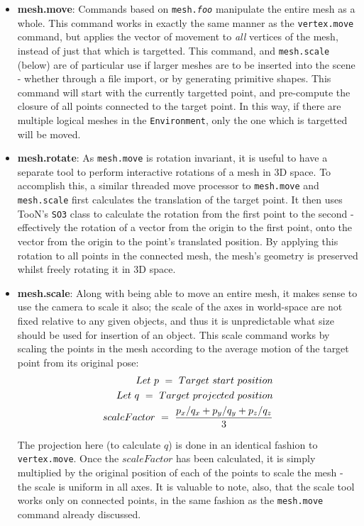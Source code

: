 \documentclass[a4paper,10pt]{report}
\begin{document}
\begin{itemize}
\item{\textbf{mesh.move}: Commands based on \texttt{mesh.\textit{foo}} manipulate the entire mesh as a whole. This command works in exactly the same manner as the \texttt{vertex.move} command, but applies the vector of movement to \textit{all} vertices of the mesh, instead of just that which is targetted. This command, and \texttt{mesh.scale} (below) are of particular use if larger meshes are to be inserted into the scene - whether through a file import, or by generating primitive shapes. This command will start with the currently targetted point, and pre-compute the closure of all points connected to the target point. In this way, if there are multiple logical meshes in the \texttt{Environment}, only the one which is targetted will be moved.}

\item{\textbf{mesh.rotate}: As \texttt{mesh.move} is rotation invariant, it is useful to have a separate tool to perform interactive rotations of a mesh in 3D space. To accomplish this, a similar threaded move processor to \texttt{mesh.move} and \texttt{mesh.scale} first calculates the translation of the target point. It then uses TooN's \texttt{SO3} class to calculate the rotation from the first point to the second - effectively the rotation of a vector from the origin to the first point, onto the vector from the origin to the point's translated position. By applying this rotation to all points in the connected mesh, the mesh's geometry is preserved whilst freely rotating it in 3D space.}

\item{\textbf{mesh.scale}: Along with being able to move an entire mesh, it makes sense to use the camera to scale it also; the scale of the axes in world-space are not fixed relative to any given objects, and thus it is unpredictable what size should be used for insertion of an object. This scale command works by scaling the points in the mesh according to the average motion of the target point from its original pose:
\begin{eqnarray*}
  Let~ p ~=~ Target~start~position \\
  Let~ q ~=~ Target~projected~position \\
  scaleFactor ~=~ {p_x / q_x + p_y / q_y + p_z / q_z \over 3}  
\end{eqnarray*}

The projection here (to calculate $q$) is done in an identical fashion to \texttt{vertex.move}. Once the $scaleFactor$ has been calculated, it is simply multiplied by the original position of each of the points to scale the mesh - the scale is uniform in all axes. It is valuable to note, also, that the scale tool works only on connected points, in the same fashion as the \texttt{mesh.move} command already discussed.}


\end{itemize}
\end{document}
